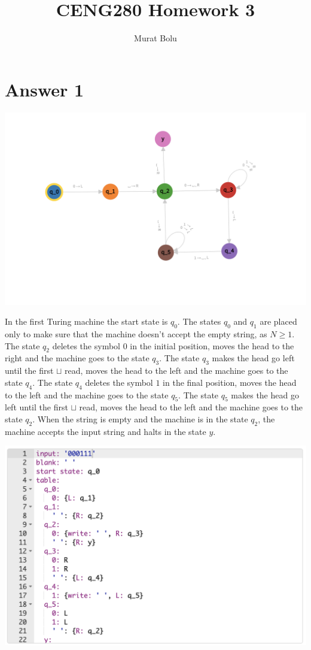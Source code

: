 \documentclass[a4paper]{article}
\title{CENG280 Homework 3}
\author{Murat Bolu}
\begin{document}
\maketitle

\section*{Answer 1}

\includegraphics[width=\textwidth]{TM1.1}

In the first Turing machine the start state is $q_0$. The states $q_0$ and $q_1$ are placed only to make sure that the machine doesn't accept the empty string, as $N \geq 1$. The state $q_2$ deletes the symbol $0$ in the initial position, moves the head to the right and the machine goes to the state $q_3$. The state $q_3$ makes the head go left until the first $\sqcup$ read, moves the head to the left and the machine goes to the state $q_4$. The state $q_4$ deletes the symbol $1$ in the final position, moves the head to the left and the machine goes to the state $q_5$. The state $q_5$ makes the head go left until the first $\sqcup$ read, moves the head to the left and the machine goes to the state $q_2$. When the string is empty and the machine is in the state $q_2$, the machine accepts the input string and halts in the state $y$.

\includegraphics[width=\textwidth]{TM1.2}
\end{document}
